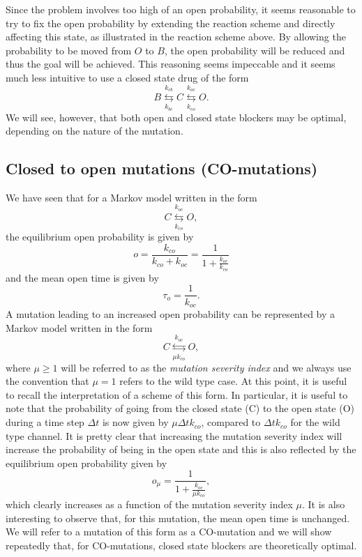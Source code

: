 Since the problem involves too high of an open probability, it seems reasonable to try to fix the open probability by extending the reaction scheme and directly affecting this state, as illustrated in the reaction scheme above. By allowing the probability to be moved from $O$ to $B$, the open probability will be reduced and thus the goal will be achieved. This reasoning seems impeccable and it seems much less intuitive to use a closed state drug of the form
\begin{equation}
B\underset{k_{bc}}{\overset{k_{cb}}{\leftrightarrows}}C\underset{
k_{co}}{\overset{k_{oc}}{\leftrightarrows}}O. \label{closed_block}
\end{equation}
We will see, however, that both open and closed state blockers may be optimal, depending on the nature of the mutation.

\subsection{Closed to open mutations (CO-mutations)}
\label{com}
We have seen that for a Markov model written in the form
\begin{equation}
C\underset{ k_{co}}{\overset{k_{oc}}{\leftrightarrows}}O,
\end{equation}
 the equilibrium open probability is given by
\[ o=\frac{k_{co}}{k_{co}+k_{oc}}=\frac{1}{1+\frac{k_{oc}}{k_{co}}} \]
and the mean open time is given by
\[ \tau_o=\frac{1}{k_{oc}}. \]
A mutation leading to an increased open probability can be represented by a Markov model written in the form
\begin{equation}
C\underset{ \mu k_{co}}{\overset{k_{oc}}{\leftrightarrows}}O,
\end{equation}
where $\mu \ge 1$ will be referred to as the {\it mutation severity index} and we always use the convention that $\mu=1$ refers to the wild type case. At this point, it is useful to recall the interpretation of a scheme of this form. In particular, it is useful to note that the probability of going from the closed state (C) to the open state (O) during a time step $\Delta t$ is now given
by $\mu \Delta t k_{co}$, compared to $\Delta t k_{co}$ for the wild type channel. It is pretty clear that increasing the mutation severity index will increase the probability of being in the open state and this is also reflected by the equilibrium open probability given by
\[o_\mu=\frac{1}{1+\frac{k_{oc}}{\mu k_{co}}}, \]
which clearly increases as a function of the mutation severity index $\mu$.
It is also interesting to observe that, for this mutation, the mean open time is unchanged. We will refer to a mutation of this form as a CO-mutation and we will show repeatedly that, for CO-mutations, closed state blockers are theoretically optimal.

